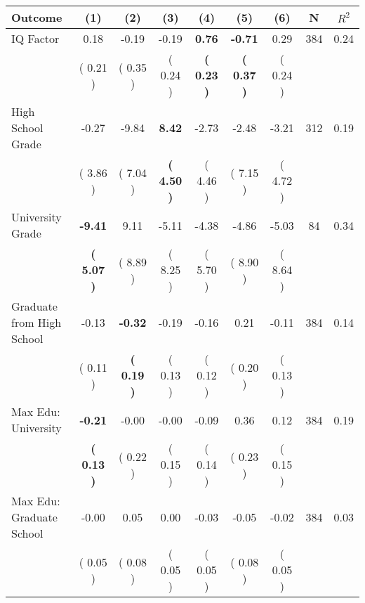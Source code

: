 \begin{tabular}{lcccccccc}
\toprule
 \textbf{Outcome} & \textbf{(1)} & \textbf{(2)} & \textbf{(3)} & \textbf{(4)} & \textbf{(5)} & \textbf{(6)} & \textbf{N} & \textbf{$ R^2$} \\
\midrule
IQ Factor &      0.18 &     -0.19 &     -0.19 & \textbf{     0.76} & \textbf{    -0.71} &      0.29 & 384 &       0.24 \\ 
 & (     0.21 ) & (     0.35 ) & (     0.24 ) & \textbf{(     0.23 )} & \textbf{(     0.37 )} & (     0.24 ) & \\
High School Grade &     -0.27 &     -9.84 & \textbf{     8.42} &     -2.73 &     -2.48 &     -3.21 & 312 &       0.19 \\ 
 & (     3.86 ) & (     7.04 ) & \textbf{(     4.50 )} & (     4.46 ) & (     7.15 ) & (     4.72 ) & \\
University Grade & \textbf{    -9.41} &      9.11 &     -5.11 &     -4.38 &     -4.86 &     -5.03 & 84 &       0.34 \\ 
 & \textbf{(     5.07 )} & (     8.89 ) & (     8.25 ) & (     5.70 ) & (     8.90 ) & (     8.64 ) & \\
Graduate from High School &     -0.13 & \textbf{    -0.32} &     -0.19 &     -0.16 &      0.21 &     -0.11 & 384 &       0.14 \\ 
 & (     0.11 ) & \textbf{(     0.19 )} & (     0.13 ) & (     0.12 ) & (     0.20 ) & (     0.13 ) & \\
Max Edu: University & \textbf{    -0.21} &     -0.00 &     -0.00 &     -0.09 &      0.36 &      0.12 & 384 &       0.19 \\ 
 & \textbf{(     0.13 )} & (     0.22 ) & (     0.15 ) & (     0.14 ) & (     0.23 ) & (     0.15 ) & \\
Max Edu: Graduate School &     -0.00 &      0.05 &      0.00 &     -0.03 &     -0.05 &     -0.02 & 384 &       0.03 \\ 
 & (     0.05 ) & (     0.08 ) & (     0.05 ) & (     0.05 ) & (     0.08 ) & (     0.05 ) & \\
\bottomrule
\end{tabular}
